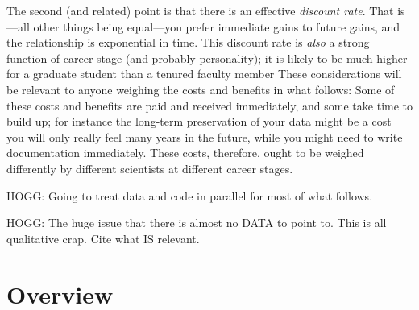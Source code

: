 \documentclass[12pt,twoside,pdftex]{article}
\begin{document}
The second (and related) point is that there is an effective
\emph{discount rate}.
That is---all other things being equal---you prefer immediate gains to
future gains, and the relationship is exponential in time.
This discount rate is \emph{also} a strong function of career stage
(and probably personality); it is likely to be much higher for a
graduate student than a tenured faculty member
These considerations will be relevant to anyone weighing the costs and
benefits in what follows:
Some of these costs and benefits are paid and received immediately,
and some take time to build up; for instance the long-term
preservation of your data might be a cost you will only really feel
many years in the future, while you might need to write documentation
immediately.
These costs, therefore, ought to be weighed differently by different
scientists at different career stages.

HOGG: Going to treat data and code in parallel for most of what follows.

HOGG: The huge issue that there is almost no DATA to point to. This is
all qualitative crap. Cite what IS relevant.

\section{Overview}
\end{document}
